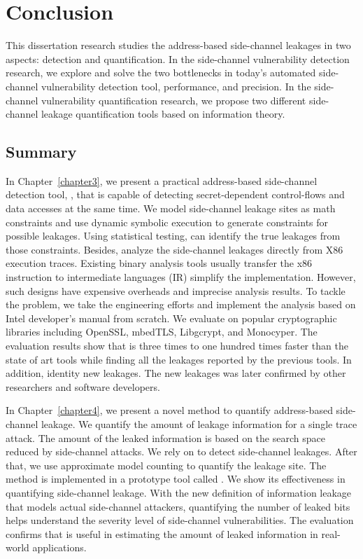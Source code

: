 \chapter{Conclusion}\label{chapter6}
This dissertation research studies the address-based side-channel leakages in two aspects: detection and quantification. In the side-channel vulnerability detection research, we explore and solve the two bottlenecks in today's automated side-channel vulnerability detection tool, performance, and precision. In the side-channel vulnerability quantification research, we propose two different side-channel leakage quantification tools based on information theory. 

\section{Summary}

In Chapter~\ref{chapter3}, we present a practical address-based side-channel detection tool, \detect{}, that is capable of detecting secret-dependent control-flows and data accesses at the same time. We model side-channel leakage sites as math constraints and use dynamic symbolic execution to generate constraints for possible leakages. Using statistical testing, \detect{} can identify the true leakages from those constraints. Besides, \detect{} analyze the side-channel leakages directly from X86 execution traces. Existing binary analysis tools usually transfer the x86 instruction to intermediate languages (IR) simplify the implementation. However, such designs have expensive overheads and imprecise analysis results. To tackle the problem, we take the engineering efforts and implement the analysis based on Intel developer's manual from scratch. We evaluate \detect{} on popular cryptographic libraries including OpenSSL, mbedTLS, Libgcrypt, and Monocyper. The evaluation results show that \detect{} is three times to one hundred times faster than the state of art tools while finding all the leakages reported by the previous tools. In addition, \detect{} identity new leakages. The new leakages was later confirmed by other researchers and software developers.  

In Chapter~\ref{chapter4}, we present a novel method to quantify address-based side-channel leakage. We quantify the amount of leakage information for a single trace attack. The amount of the leaked information is based on the search space reduced by side-channel attacks. We rely on \detect{} to detect side-channel leakages. After that, we use approximate model counting to quantify the leakage site. The method is implemented in a prototype tool called \tool{}. We show its effectiveness in quantifying side-channel leakage. With the new definition of information leakage that models actual side-channel attackers, quantifying the number of leaked bits helps understand the severity level of side-channel vulnerabilities. The evaluation confirms that \tool{} is useful in estimating the amount of leaked information in real-world applications.

